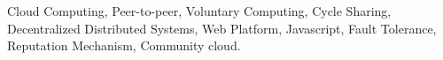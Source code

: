 
% 
% 

\begin{keywords}
Cloud Computing, Peer-to-peer, Voluntary Computing, Cycle Sharing, Decentralized Distributed Systems, Web Platform, Javascript, Fault Tolerance, Reputation Mechanism, Community cloud.
\end{keywords}